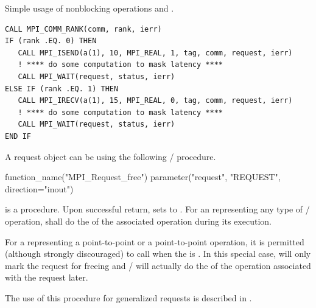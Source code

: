 \begin{example}
\label{pt2pt-exJ}
%
%
Simple usage of nonblocking operations and .
\begin{lstlisting}[language={[MPI]Fortran}]
CALL MPI_COMM_RANK(comm, rank, ierr)
IF (rank .EQ. 0) THEN
   CALL MPI_ISEND(a(1), 10, MPI_REAL, 1, tag, comm, request, ierr)
   ! **** do some computation to mask latency ****
   CALL MPI_WAIT(request, status, ierr)
ELSE IF (rank .EQ. 1) THEN
   CALL MPI_IRECV(a(1), 15, MPI_REAL, 0, tag, comm, request, ierr)
   ! **** do some computation to mask latency ****
   CALL MPI_WAIT(request, status, ierr)
END IF
\end{lstlisting}
\end{example}

A request object can be  using the following \MPI/ procedure.

\begin{mpi-binding}
    function_name("MPI_Request_free")
    parameter("request", "REQUEST", direction="inout")
\end{mpi-binding}

 is a  procedure. Upon successful return,
 sets  to .
For an   representing any type of \MPI/ operation,
 shall do the  of the associated
operation during its execution.

For a  representing a  point-to-point
or a  point-to-point operation, it is permitted (although
strongly discouraged) to call  when the
 is . In this special case, 
will only mark the request for freeing and \MPI/ will actually do the
 of the operation associated with the request later.

The use of this procedure for generalized requests is described in
.

